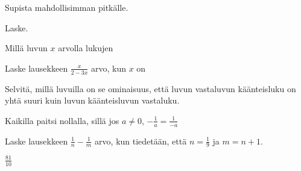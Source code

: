 \begin{tehtavasivu}
\begin{tehtava}
Supista mahdollisimman pitkälle.
	\begin{vastaus}
	\end{vastaus}
\end{tehtava}

\begin{tehtava}
Laske.
	\begin{vastaus}
	\end{vastaus}
\end{tehtava}

\begin{tehtava}
Millä luvun $x$ arvolla lukujen 
	\begin{vastaus}
	\end{vastaus}
\end{tehtava}

\begin{tehtava}
Laske lausekkeen $\frac{x}{2-3x}$ arvo, kun $x$ on
\begin{vastaus}
\end{vastaus}
\end{tehtava}

\begin{tehtava}
Selvitä, millä luvuilla on se ominaisuus, että luvun vastaluvun käänteisluku on yhtä suuri kuin luvun käänteisluvun vastaluku.
	\begin{vastaus}
Kaikilla paitsi nollalla, sillä jos $a \neq 0$, $-\frac{1}{a} = \frac{1}{-a}$
	\end{vastaus}
\end{tehtava}

\begin{tehtava}
	Laske lausekkeen $\frac{1}{n}-\frac{1}{m}$ arvo, kun tiedetään, että $n = \frac{1}{9}$ ja $m=n+1$.
	\begin{vastaus}
		$\frac{81}{10}$
	\end{vastaus}
\end{tehtava}


\end{tehtavasivu}
